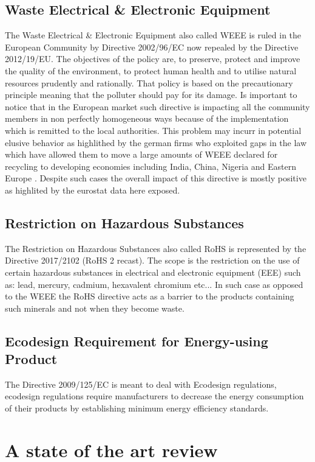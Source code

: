 \documentclass{article}
\begin{document}
\subsection{Waste Electrical \& Electronic Equipment}
The Waste Electrical \& Electronic Equipment also called WEEE is ruled in the European Community by Directive 2002/96/EC now repealed by the Directive 2012/19/EU. The objectives of the policy are, to preserve, protect and improve the quality of the environment, to protect human health and to utilise natural resources prudently and rationally. That policy is based on the precautionary principle meaning that the polluter should pay for its damage. Is important to notice that in the European market such directive is impacting all the community members in non perfectly homogeneous ways because of the implementation which is remitted to the local authorities. This problem may incurr in potential elusive behavior as highlithed by the german firms who exploited gaps in the law which  have allowed them to move a large amounts of WEEE declared for recycling to developing economies including India, China, Nigeria and Eastern Europe \cite{ongondo_how_2011}. Despite such cases the overall impact of this directive is mostly positive as highlited by the eurostat data here exposed.


\subsection{Restriction on Hazardous Substances}
The Restriction on Hazardous Substances also called RoHS is represented by the Directive 2017/2102 (RoHS 2 recast). The scope is the restriction on the use of certain hazardous substances in electrical and electronic equipment (EEE) such as: lead, mercury, cadmium, hexavalent chromium etc... In such case as opposed to the WEEE the RoHS directive acts as a barrier to the products containing such minerals and not when they become waste.

\subsection{Ecodesign Requirement for Energy-using Product}
The Directive 2009/125/EC is meant to deal with Ecodesign regulations, ecodesign regulations require manufacturers to decrease the energy consumption of their products by establishing minimum energy efficiency standards. 


\section{A state of the art review}
\end{document}
